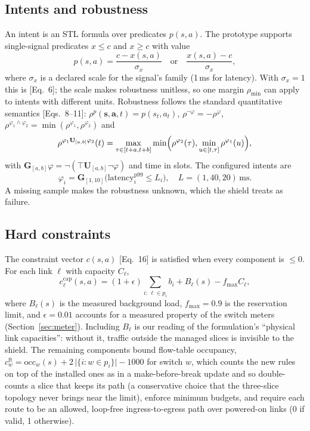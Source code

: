 \documentclass[conference]{IEEEtran}
\newcommand{\rhomin}{\rho_{\min}}
\newcommand{\stlG}{\mathbf{G}}
\newcommand{\stlU}{\mathbf{U}}
\begin{document}
\subsection{Intents and robustness}
An intent is an STL formula over predicates $p(s,a)$. The prototype supports
single-signal predicates $x \le c$ and $x \ge c$ with value
\begin{equation}
p(s,a) = \frac{c - x(s,a)}{\sigma_x} \quad\text{or}\quad \frac{x(s,a) - c}{\sigma_x},
\label{eq:pred}
\end{equation}
where $\sigma_x$ is a declared scale for the signal's family (1\,ms for latency).
With $\sigma_x = 1$ this is [Eq.~6]; the scale makes robustness unitless, so one
margin $\rhomin$ can apply to intents with different units. Robustness follows the
standard quantitative semantics \cite{donze2010robust} [Eqs.~8--11]:
$\rho^{p}(\mathbf{s},\mathbf{a},t) = p(s_t,a_t)$,
$\rho^{\neg\varphi} = -\rho^{\varphi}$,
$\rho^{\varphi_1\wedge\varphi_2} = \min(\rho^{\varphi_1},\rho^{\varphi_2})$ and
\begin{equation}
\rho^{\varphi_1 \stlU_{[a,b]} \varphi_2}(t) =
\max_{\tau\in[t+a,t+b]} \min\Bigl(\rho^{\varphi_2}(\tau), \min_{u\in[t,\tau]} \rho^{\varphi_1}(u)\Bigr),
\end{equation}
with $\stlG_{[a,b]}\varphi = \neg(\top \stlU_{[a,b]} \neg\varphi)$ and time in
slots. The configured intents are
\begin{equation}
\varphi_i = \stlG_{[1,10]}\bigl(\text{latency}^{\mathrm{p99}}_i \le L_i\bigr),\quad
L = (1, 40, 20)\,\text{ms}.
\label{eq:intents}
\end{equation}
A missing sample makes the robustness unknown, which the shield treats as failure.

\subsection{Hard constraints}
The constraint vector $c(s,a)$ [Eq.~16] is satisfied when every component is
$\le 0$. For each link $\ell$ with capacity $C_\ell$,
\begin{equation}
c^{\mathrm{cap}}_\ell(s,a) = (1+\epsilon)\!\!\sum_{i:\,\ell \in p_i}\! b_i
 + B_\ell(s) - f_{\max} C_\ell ,
\label{eq:cap}
\end{equation}
where $B_\ell(s)$ is the measured background load, $f_{\max} = 0.9$ is the
reservation limit, and $\epsilon = 0.01$ accounts for a measured property of the
switch meters (Section~\ref{sec:meter}). Including $B_\ell$ is our reading of the
formulation's ``physical link capacities'': without it, traffic outside the managed
slices is invisible to the shield. The remaining components bound flow-table
occupancy, $c^{\mathrm{ft}}_{w} = \mathrm{occ}_w(s) + 2\,\lvert\{i : w \in p_i\}\rvert - 1000$
for switch $w$, which counts the new rules on top of the installed ones as in a
make-before-break update and so double-counts a slice that keeps its path (a
conservative choice that the three-slice topology never brings near the limit), enforce minimum budgets, and require each route to be an allowed,
loop-free ingress-to-egress path over powered-on links (0 if valid, 1 otherwise).
\end{document}
